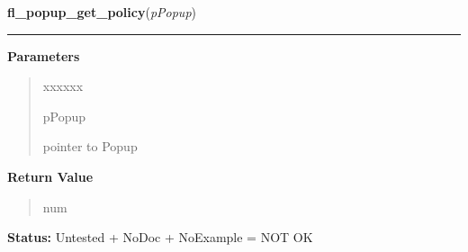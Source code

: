 \hspace{.8\funcindent}\begin{boxedminipage}{\funcwidth}

    \raggedright \textbf{fl\_popup\_get\_policy}(\textit{pPopup})

    \vspace{-1.5ex}

    \rule{\textwidth}{0.5\fboxrule}
\setlength{\parskip}{2ex}
\setlength{\parskip}{1ex}
      \textbf{Parameters}
      \vspace{-1ex}

      \begin{quote}
        \begin{Ventry}{xxxxxx}

          \item[pPopup]

          pointer to Popup

        \end{Ventry}

      \end{quote}

      \textbf{Return Value}
    \vspace{-1ex}

      \begin{quote}
      num

      \end{quote}

\textbf{Status:} Untested + NoDoc + NoExample = NOT OK



    \end{boxedminipage}

    \label{xformslib:library:fl_popup_set_policy}

    \vspace{0.5ex}

